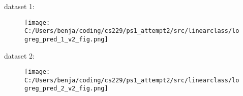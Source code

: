 %
%
	
\begin{answer}

dataset 1:
\begin{figure}[H]
	\texttt{[image: C:/Users/benja/coding/cs229/ps1\_attempt2/src/linearclass/logreg\_pred\_1\_v2\_fig.png]}
\end{figure}
dataset 2:
\begin{figure}[H]
	\texttt{[image: C:/Users/benja/coding/cs229/ps1\_attempt2/src/linearclass/logreg\_pred\_2\_v2\_fig.png]}
\end{figure}
\end{answer}

%
